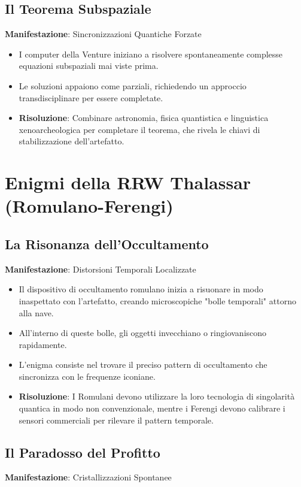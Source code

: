 \documentclass[letterpaper,twocolumn,openany,nodeprecatedcode]{dndbook}
\begin{document}
\subsection{Il Teorema Subspaziale}
\textbf{Manifestazione}: Sincronizzazioni Quantiche Forzate

\begin{itemize}
    \item I computer della Venture iniziano a risolvere spontaneamente complesse equazioni subspaziali mai viste prima.
    \item Le soluzioni appaiono come parziali, richiedendo un approccio transdisciplinare per essere completate.
    \item \textbf{Risoluzione}: Combinare astronomia, fisica quantistica e linguistica xenoarcheologica per completare il teorema, che rivela le chiavi di stabilizzazione dell'artefatto.
\end{itemize}



\section{Enigmi della RRW Thalassar (Romulano-Ferengi)}
\subsection{La Risonanza dell'Occultamento}
\textbf{Manifestazione}: Distorsioni Temporali Localizzate

\begin{itemize}
    \item Il dispositivo di occultamento romulano inizia a risuonare in modo inaspettato con l'artefatto, creando microscopiche "bolle temporali" attorno alla nave.
    \item All'interno di queste bolle, gli oggetti invecchiano o ringiovaniscono rapidamente.
    \item L'enigma consiste nel trovare il preciso pattern di occultamento che sincronizza con le frequenze iconiane.
    \item \textbf{Risoluzione}: I Romulani devono utilizzare la loro tecnologia di singolarità quantica in modo non convenzionale, mentre i Ferengi devono calibrare i sensori commerciali per rilevare il pattern temporale.
\end{itemize}

\subsection{Il Paradosso del Profitto}
\textbf{Manifestazione}: Cristallizzazioni Spontanee
\end{document}
